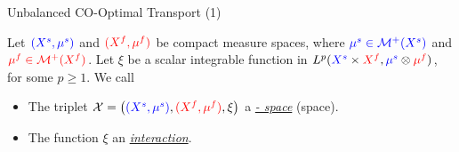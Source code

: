\documentclass{beamer}
\newcommand{\cX}{\mathcal X}
\newcommand{\cM}{\mathcal M}
\newcommand{\sfspace}{{\color{blue}{s.}}{\color{red}{f. }}}
\begin{document}
\begin{frame}{Unbalanced CO-Optimal Transport (1)}
\scriptsize
  \begin{definition}
    Let ${\color{blue}{(X^s, \mu^s)}}$ and ${\color{red}{(X^f, \mu^f)}}$ be compact measure spaces, where ${\color{blue}{\mu^s \in \cM^+(X^s)}}$ and ${\color{red}{\mu^f \in \cM^+(X^f)}}$. Let $\xi$ be a scalar integrable function in $L^p({\color{blue}{X^s}} \times {\color{red}{X^f}}, {\color{blue}{\mu^s}} \otimes {\color{red}{\mu^f}})$, for some $p \geq 1$. We call
    \begin{itemize}
      \item The triplet
      $\cX = \left({\color{blue}{(X^s, \mu^s)}}, {\color{red}{(X^f, \mu^f)}}, \xi \right)$
      a \underline{\textit{{\color{blue}{sample}} - {\color{red}{feature}} space}}
      (\sfspace space).

      \item The function $\xi$ an \textit{\underline{interaction}}.
    \end{itemize}
  \end{definition}
  \vspace{-0.2cm}



\end{frame}
\end{document}
